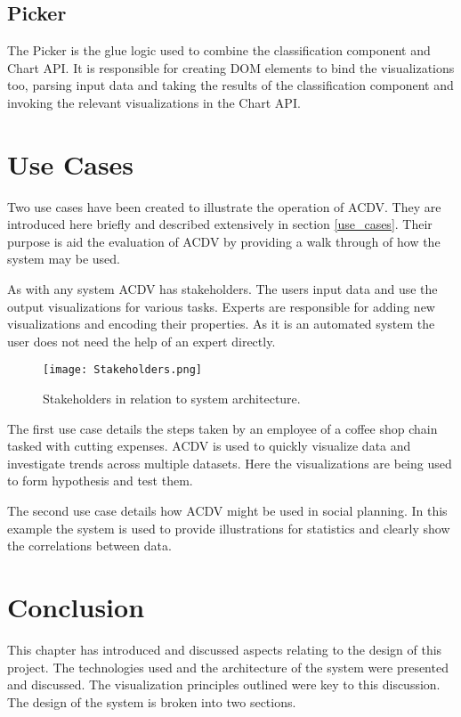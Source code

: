 \documentclass[a4paper, 11pt, titlepage, onehalfspacing]{report}
\begin{document}
\subsection{Picker}
The Picker is the glue logic used to combine the classification component and Chart API. It is responsible for creating DOM elements to bind the visualizations too, parsing input data and taking the results of the classification component and invoking the relevant visualizations in the Chart API.

\section{Use Cases}
Two use cases have been created to illustrate the operation of AC\lightning{}DV. They are introduced here briefly and described extensively in section \ref{use_cases}. Their purpose is aid the evaluation of AC\lightning{}DV by providing a walk through of how the system may be used.

As with any system AC\lightning{}DV has stakeholders. The users input data and use the output visualizations for various tasks. Experts are responsible for adding new visualizations and encoding their properties. As it is an automated system the user does not need the help of an expert directly.
\begin{figure}[htp] \centering
\texttt{[image: Stakeholders.png]}
\caption{Stakeholders in relation to system architecture.}
\label{stakeholders}
\end{figure}


The first use case details the steps taken by an employee of a coffee shop chain tasked with cutting expenses. AC\lightning{}DV is used to quickly visualize data and investigate trends across multiple datasets. Here the visualizations are being used to form hypothesis and test them.

The second use case details how AC\lightning{}DV might be used in social planning. In this example the system is used to provide illustrations for statistics and clearly show the correlations between data.  

\section{Conclusion}
This chapter has introduced and discussed aspects relating to the design of this project. The technologies used and the architecture of the system were presented and discussed. The visualization principles outlined were key to this discussion. The design of the system is broken into two sections.
\end{document}
